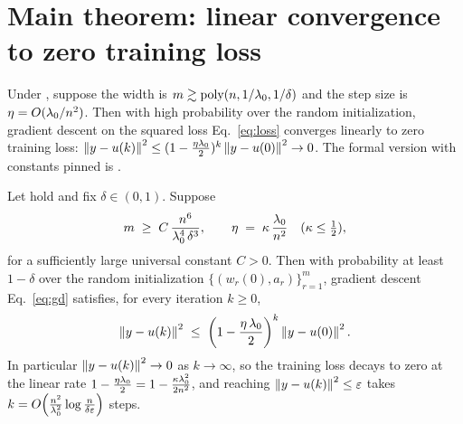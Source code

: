 \section{Main theorem: linear convergence to zero training loss}\label{sec:main}

\begin{remark}\label{rem:informal}
Under , suppose the width is $m \gtrsim \operatorname{poly}(n, 1/\lambda_{0}, 1/\delta)$ and the
step size is $\eta = O(\lambda_{0} / n^2)$. Then with high probability over the random
initialization, gradient descent on the squared loss Eq.~\eqref{eq:loss} converges linearly to
zero training loss: $\left\| y - u(k) \right\|^2 \le (1 - \tfrac{\eta\lambda_{0}}{2})^k \left\| y - u(0) \right\|^2
\to 0$. The formal version with constants pinned is .
\end{remark}

\begin{theorem}\label{thm:main}
Let  hold and fix $\delta \in (0, 1)$. Suppose
\begin{align}\label{eq:thm-conditions}
m \;\ge\; C\, \frac{n^6}{\lambda_{0}^4\, \delta^3},
\qquad
\eta \;=\; \kappa\, \frac{\lambda_{0}}{n^2}
\quad (\kappa \le \tfrac12),
\end{align}
for a sufficiently large universal constant $C > 0$. Then with probability at least
$1 - \delta$ over the random initialization $\{(w_r(0), a_r)\}_{r=1}^m$, gradient descent
Eq.~\eqref{eq:gd} satisfies, for every iteration $k \ge 0$,
\begin{align}\label{eq:thm-conv}
\left\|  y - u(k)  \right\|^2 \;\le\; \left( 1 - \frac{\eta\,\lambda_{0}}{2} \right)^{k} \left\|  y - u(0)  \right\|^2 .
\end{align}
In particular $\left\| y - u(k) \right\|^2 \to 0$ as $k \to \infty$, so the training loss decays to zero
at the linear rate $1 - \tfrac{\eta\lambda_{0}}{2} = 1 - \tfrac{\kappa\lambda_{0}^2}{2n^2}$, and reaching
$\left\| y - u(k) \right\|^2 \le \varepsilon$ takes
$k = O\!\left( \tfrac{n^2}{\lambda_{0}^2} \log\tfrac{n}{\delta\varepsilon} \right)$ steps.
\end{theorem}

